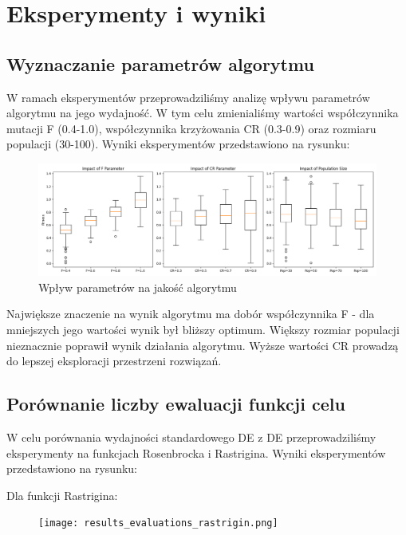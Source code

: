 \documentclass{article}
\begin{document}
\section{Eksperymenty i wyniki}

\subsection{Wyznaczanie parametrów algorytmu}
W ramach eksperymentów przeprowadziliśmy analizę wpływu parametrów algorytmu na jego wydajność. W tym celu zmienialiśmy wartości współczynnika mutacji F (0.4-1.0), współczynnika krzyżowania CR (0.3-0.9) oraz rozmiaru populacji (30-100). Wyniki eksperymentów przedstawiono na rysunku:

\begin{figure}[H]
    \centering
    \includegraphics[width=\textwidth]{parameter_tuning_results.png}
    \caption{Wpływ parametrów na jakość algorytmu}
    \label{fig:parameter_results}
\end{figure}

Największe znaczenie na wynik algorytmu ma dobór współczynnika F - dla mniejszych jego wartości wynik był bliższy optimum. Większy rozmiar populacji nieznacznie poprawił wynik działania algorytmu. Wyższe wartości CR prowadzą do lepszej eksploracji przestrzeni rozwiązań.

\subsection{Porównanie liczby ewaluacji funkcji celu}
W celu porównania wydajności standardowego DE z DE przeprowadziliśmy eksperymenty na funkcjach Rosenbrocka i Rastrigina. Wyniki eksperymentów przedstawiono na rysunku:

Dla funkcji Rastrigina:

\begin{figure}[H]
    \centering
    \texttt{[image: results\_evaluations\_rastrigin.png]}
    \label{fig:results_evaluations}
\end{figure}
\end{document}
